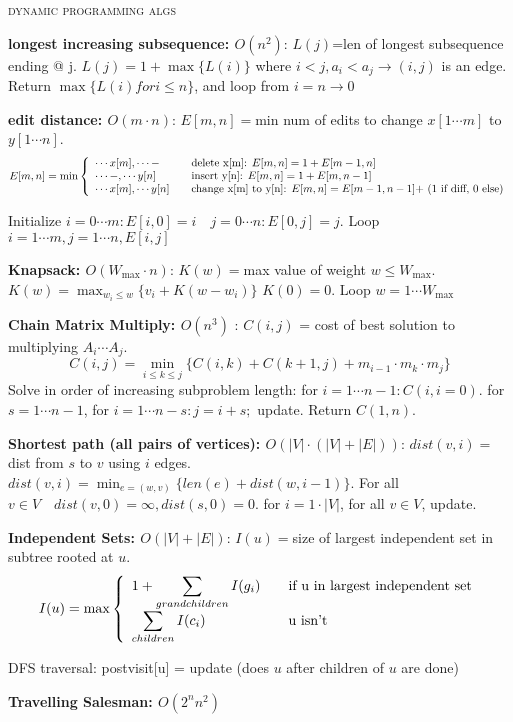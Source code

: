 \documentclass{article}
\begin{document}
\begin{center}\textsc{dynamic programming algs}\end{center} 
{\bf longest increasing subsequence: $O(n^2)$}:
$L(j)$=len of longest subsequence ending @ j. $L(j)=1+\max\{L(i)\}$ where $i<j,a_i < a_j \rightarrow (i,j)$ is an edge. Return $\max\{L(i) for i\leq n\}$, and loop from $i=n\rightarrow 0$

{\bf edit distance: $O(m\cdot n)$}: $E[m,n]=$min num of edits to change $x[1\cdots m]$ to $y[1\cdots n]$. \[E[m,n] = \min\left\{ \begin{array}{l l} \cdots x[m] , \cdots - & \quad \mbox{delete x[m]: $E[m,n]=1+E[m-1,n]$} \\ \cdots -, \cdots y[n] & \quad \mbox{insert y[n]: $E[m,n]=1+E[m,n-1]$} \\ \cdots x[m], \cdots y[n] & \quad \mbox{change x[m] to y[n]: $E[m,n]=E[m-1,n-1] +$ (1 if diff, 0 else)}  \end{array} \right. \]

Initialize $i=0\cdots m: E[i,0] = i \quad j=0\cdots n: E[0,j]=j$. Loop $i=1\cdots m, j=1\cdots n, E[i,j]$

{\bf Knapsack: $O(W_{\max}\cdot n)$}: $K(w)=$max value of weight $w\leq W_{\max}$. $K(w)=\displaystyle\max_{w_i\leq w}\{v_i+K(w-w_i)\}$ $K(0)=0$. Loop $w=1\cdots W_{\max}$

{\bf Chain Matrix Multiply: $O(n^3)$} : $C(i,j)$ = cost of best solution to multiplying $A_i\cdots A_j$. \[C(i,j)=\displaystyle\min_{i\leq k\leq j}\{ C(i,k)+C(k+1,j) + m_{i-1}\cdot m_k \cdot m_j\}\] Solve in order of increasing subproblem length: for $i=1\cdots n-1: C(i,i=0)$. for $s=1\cdots n-1$, for $i=1\cdots n-s: j=i+s; $ update. Return $C(1,n)$.

{\bf Shortest path (all pairs of vertices): $O(|V|\cdot(|V|+|E|))$}: $dist(v,i)=$ dist from $s$ to $v$ using $i$ edges. $dist(v,i)=\displaystyle\min_{e=(w,v)}\{len(e)+dist(w,i-1)\}$. For all $v\in V \quad dist(v,0)=\infty, dist(s,0)=0$. for $i=1\cdot |V|$, for all $v\in V$, update.

{\bf Independent Sets: $O(|V|+|E|)$}: $I(u)=$size of largest independent set in subtree rooted at $u$. \[I(u) = \max\left\{ \begin{array}{l l} 1+\displaystyle\sum_{grandchildren} I(g_i) & \quad \mbox{if u in largest independent set} \\ \displaystyle\sum_{children} I(c_i) & \quad \mbox{u isn't} \\ \end{array} \right. \]

DFS traversal: postvisit[u] = update (does $u$ after children of $u$ are done)

{\bf Travelling Salesman: $O(2^nn^2)$} 
\end{document}
